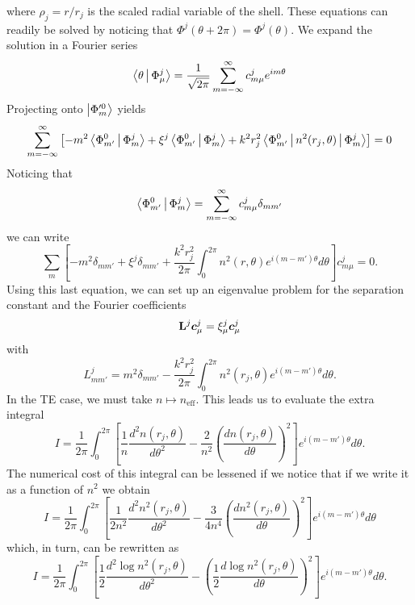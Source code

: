 where $\rho_j=r/r_j$ is the scaled radial variable of the shell. 
These equations can readily be solved by noticing that
$\Phi^j(\theta+2\pi)=\Phi^j(\theta)$. We expand the solution
in a Fourier series
  \begin{equation}
   \Braket{\theta|\Phi_\mu^j} = \frac{1}{\sqrt{2\pi}}\sum_{m=-\infty}^\infty c_{m\mu}^je^{im\theta}
  \end{equation}
Projecting onto $\Ket{\Phi_m'^0}$ yields
\begin{equation}
    \sum_{m=-\infty}^\infty\left[-m^2\Braket{\Phi_{m'}^0|\Phi_m^j}+\xi^j\Braket{\Phi_{m'}^0|\Phi_m^j}+k^2r_j^2\Braket{\Phi_{m'}^0|n^2(r_j,\theta)|\Phi_m^j}\right]=0
  \end{equation}
Noticing that 
  \begin{equation}
    \Braket{\Phi_{m'}^0|\Phi_{m}^j} = \sum_{m=-\infty}^\infty c_{m\mu}^j \delta_{mm'}
  \end{equation}
we can write
  \begin{equation}
    \sum_m\left[-m^2\delta_{mm'}+\xi^j\delta_{mm'} + \frac{k^2r_j^2}{2\pi}\int_{0}^{2\pi}n^2(r,\theta)e^{i(m-m')\theta}d\theta\right]c_{m\mu}^j =0.
  \end{equation}
Using this last equation, we can set up an eigenvalue 
problem for the separation constant and the Fourier coefficients
  \begin{equation}
   \mathbf{L}^j\boldsymbol{c}_\mu^j=\xi_\mu^j\boldsymbol{c}_\mu^j
  \end{equation}
with
  \begin{equation}
    L_{mm'}^j = m^2\delta_{mm'}-\frac{k^2r_j^2}{2\pi}\int_0^{2\pi}n^2(r_j,\theta)e^{i(m-m')\theta}d\theta.
  \end{equation}
In the TE case, we must take $n\mapsto n_\text{eff}$. This leads us to evaluate the 
extra integral
  \begin{equation}
   I = \frac{1}{2\pi}\int_0^{2\pi}\left[\frac{1}{n}\frac{d^2n(r_j,\theta)}{d\theta^2}-\frac{2}{n^2}\left(\frac{dn(r_j,\theta)}{d\theta}\right)^2\right]e^{i(m-m')\theta}d\theta.
  \end{equation}
The numerical cost of this integral can be lessened 
if we notice that if we write it as a function of $n^2$ we obtain
  \begin{equation}
   I = \frac{1}{2\pi}\int_0^{2\pi}\left[\frac{1}{2n^2}\frac{d^2n^2(r_j,\theta)}{d\theta^2}-\frac{3}{4n^4}\left(\frac{dn^2(r_j,\theta)}{d\theta}\right)^2\right]e^{i(m-m')\theta}d\theta
  \end{equation}
which, in turn, can be rewritten as
  \begin{equation}
   I = \frac{1}{2\pi}\int_0^{2\pi}\left[\frac{1}{2}\frac{d^2\log n^2(r_j,\theta)}{d\theta^2}-\left(\frac{1}{2}\frac{d\log n^2(r_j,\theta)}{d\theta}\right)^2\right]e^{i(m-m')\theta}d\theta.
  \end{equation}
